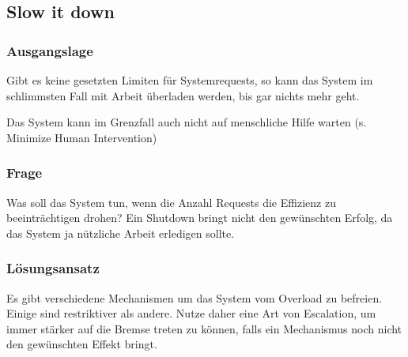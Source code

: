 \subsection{Slow it down}

\subsubsection*{Ausgangslage}


Gibt es keine gesetzten Limiten für Systemrequests, so kann das System im schlimmsten Fall mit Arbeit überladen werden, bis gar nichts mehr geht.

Das System kann im Grenzfall auch nicht auf menschliche Hilfe warten (s. Minimize Human Intervention)

\subsubsection*{Frage}


Was soll das System tun, wenn die Anzahl Requests die Effizienz zu beeinträchtigen drohen?
Ein Shutdown bringt nicht den gewünschten Erfolg, da das System ja nützliche Arbeit erledigen sollte.

\subsubsection*{Lösungsansatz}


Es gibt verschiedene Mechanismen um das System vom Overload zu befreien. Einige sind restriktiver als andere. Nutze daher eine Art von Escalation, um immer stärker auf die Bremse treten zu können, falls ein Mechanismus noch nicht den gewünschten Effekt bringt.

